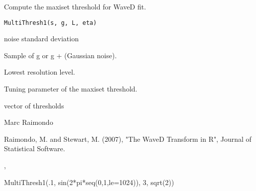 \begin{Description}\relax
Compute the maxiset threshold for WaveD fit.
\end{Description}
\begin{Usage}
\begin{verbatim}
MultiThresh1(s, g, L, eta)
\end{verbatim}
\end{Usage}
\begin{Arguments}
\begin{ldescription}
\item[\code{s}] noise standard deviation  
\item[\code{g}] Sample of g or g + (Gaussian noise). 
\item[\code{L}] Lowest resolution level. 
\item[\code{eta}] Tuning parameter of the maxiset threshold. 
\end{ldescription}
\end{Arguments}
\begin{Value}
vector of thresholds
\end{Value}
\begin{Author}\relax
Marc Raimondo
\end{Author}
\begin{References}\relax
Raimondo, M. and Stewart, M. (2007),
"The WaveD Transform in R", Journal of Statistical Software.
\end{References}
\begin{SeeAlso}\relax
{},
\end{SeeAlso}
\begin{Examples}
\begin{ExampleCode}

MultiThresh1(.1, sin(2*pi*seq(0,1,le=1024)), 3, sqrt(2))
\end{ExampleCode}
\end{Examples}

